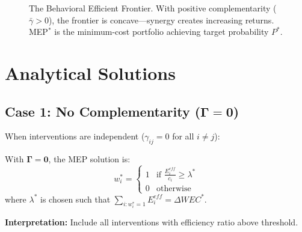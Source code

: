 \begin{figure}[htbp]
\centering
{}
\caption{The Behavioral Efficient Frontier. With positive complementarity ($\bar{\gamma} > 0$),
the frontier is concave---synergy creates increasing returns. MEP$^*$ is the minimum-cost
portfolio achieving target probability $P^*$.}
\label{fig:frontier}
\end{figure}


\section{Analytical Solutions}
\label{sec:mep-solutions}

\subsection{Case 1: No Complementarity ($\boldsymbol{\Gamma} = \mathbf{0}$)}

When interventions are independent ($\gamma_{ij} = 0$ for all $i \neq j$):

\begin{proposition}
\label{prop:independent}
With $\boldsymbol{\Gamma} = \mathbf{0}$, the MEP solution is:
\begin{equation}
w_i^* = \begin{cases}
1 & \text{if } \frac{E_i^{eff}}{c_i} \geq \lambda^* \\
0 & \text{otherwise}
\end{cases}
\end{equation}
where $\lambda^*$ is chosen such that $\sum_{i: w_i^* = 1} E_i^{eff} = \Delta WEC^*$.

\textbf{Interpretation:} Include all interventions with efficiency ratio above threshold.
\end{proposition}

